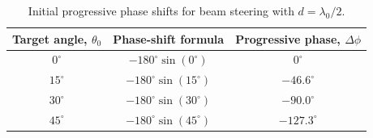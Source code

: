 \begin{table}[H]
\centering
\caption{Initial progressive phase shifts for beam steering with \(d=\lambda_0/2\).}
\label{tab:beamsteering-phase-starting-values}
\small
\setlength{\tabcolsep}{8pt}
\renewcommand{\arraystretch}{1.20}

\begin{tabular}{@{}ccc@{}}
\toprule
\textbf{Target angle, \(\theta_0\)} &
\textbf{Phase-shift formula} &
\textbf{Progressive phase, \(\Delta\phi\)} \\
\midrule

\(0^\circ\) &
\(-180^\circ\sin(0^\circ)\) &
\(0^\circ\) \\

\(15^\circ\) &
\(-180^\circ\sin(15^\circ)\) &
\(-46.6^\circ\) \\

\(30^\circ\) &
\(-180^\circ\sin(30^\circ)\) &
\(-90.0^\circ\) \\

\(45^\circ\) &
\(-180^\circ\sin(45^\circ)\) &
\(-127.3^\circ\) \\

\bottomrule
\end{tabular}
\end{table}
